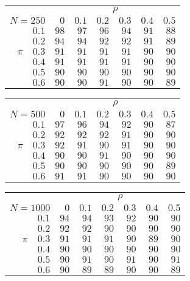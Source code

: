 \begin{tabular}{r|rrrrrr}
\hline\hline
 &\multicolumn{6}{c}{$\rho$} \\ 
 $N = 250$ & $0$ & $0.1$ & $0.2$ & $0.3$ & $0.4$ & $0.5$ \\ 
 \hline$0.1$ & $98$ & $97$ & $96$ & $94$ & $91$ & $88$\\ 
$0.2$ & $94$ & $94$ & $92$ & $92$ & $91$ & $89$\\ 
$\pi\quad$$0.3$ & $91$ & $91$ & $91$ & $91$ & $90$ & $90$\\ 
$0.4$ & $91$ & $91$ & $91$ & $91$ & $90$ & $90$\\ 
$0.5$ & $90$ & $90$ & $90$ & $90$ & $90$ & $90$\\ 
$0.6$ & $90$ & $90$ & $91$ & $90$ & $90$ & $89$\\ 
 \hline 
 \end{tabular}
 
 \vspace{2em} 
 
\begin{tabular}{r|rrrrrr}
\hline\hline
 &\multicolumn{6}{c}{$\rho$} \\ 
 $N = 500$ & $0$ & $0.1$ & $0.2$ & $0.3$ & $0.4$ & $0.5$ \\ 
 \hline$0.1$ & $97$ & $96$ & $94$ & $92$ & $90$ & $87$\\ 
$0.2$ & $92$ & $92$ & $92$ & $91$ & $90$ & $90$\\ 
$\pi\quad$$0.3$ & $92$ & $91$ & $90$ & $91$ & $90$ & $90$\\ 
$0.4$ & $90$ & $90$ & $91$ & $90$ & $90$ & $90$\\ 
$0.5$ & $90$ & $90$ & $90$ & $90$ & $90$ & $89$\\ 
$0.6$ & $91$ & $91$ & $90$ & $90$ & $90$ & $90$\\ 
 \hline 
 \end{tabular}
 
 \vspace{2em} 
 
\begin{tabular}{r|rrrrrr}
\hline\hline
 &\multicolumn{6}{c}{$\rho$} \\ 
 $N = 1000$ & $0$ & $0.1$ & $0.2$ & $0.3$ & $0.4$ & $0.5$ \\ 
 \hline$0.1$ & $94$ & $94$ & $93$ & $92$ & $90$ & $90$\\ 
$0.2$ & $92$ & $92$ & $90$ & $90$ & $90$ & $90$\\ 
$\pi\quad$$0.3$ & $91$ & $91$ & $91$ & $90$ & $89$ & $90$\\ 
$0.4$ & $90$ & $90$ & $90$ & $90$ & $90$ & $90$\\ 
$0.5$ & $90$ & $91$ & $90$ & $91$ & $90$ & $91$\\ 
$0.6$ & $90$ & $89$ & $89$ & $90$ & $90$ & $89$\\ 
 \hline 
 \end{tabular}